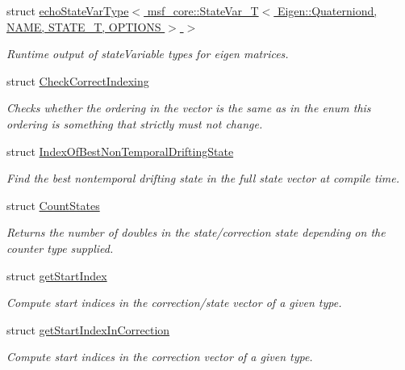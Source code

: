 \begin{DoxyCompactItemize}
struct \hyperlink{structmsf__tmp_1_1echoStateVarType_3_01msf__core_1_1StateVar__T_3_01Eigen_1_1Quaterniond_00_01NAd8d0cc57ae8a4161cb849186069681d6}{echo\-State\-Var\-Type$<$ msf\-\_\-core\-::\-State\-Var\-\_\-\-T$<$ Eigen\-::\-Quaterniond, N\-A\-M\-E, S\-T\-A\-T\-E\-\_\-\-T, O\-P\-T\-I\-O\-N\-S $>$ $>$}
\begin{DoxyCompactList}\small\item\em Runtime output of state\-Variable types for eigen matrices. \end{DoxyCompactList}\item 
struct \hyperlink{structmsf__tmp_1_1CheckCorrectIndexing}{Check\-Correct\-Indexing}
\begin{DoxyCompactList}\small\item\em Checks whether the ordering in the vector is the same as in the enum this ordering is something that strictly must not change. \end{DoxyCompactList}\item 
struct \hyperlink{structmsf__tmp_1_1IndexOfBestNonTemporalDriftingState}{Index\-Of\-Best\-Non\-Temporal\-Drifting\-State}
\begin{DoxyCompactList}\small\item\em Find the best nontemporal drifting state in the full state vector at compile time. \end{DoxyCompactList}\item 
struct \hyperlink{structmsf__tmp_1_1CountStates}{Count\-States}
\begin{DoxyCompactList}\small\item\em Returns the number of doubles in the state/correction state depending on the counter type supplied. \end{DoxyCompactList}\item 
struct \hyperlink{structmsf__tmp_1_1getStartIndex}{get\-Start\-Index}
\begin{DoxyCompactList}\small\item\em Compute start indices in the correction/state vector of a given type. \end{DoxyCompactList}\item 
struct \hyperlink{structmsf__tmp_1_1getStartIndexInCorrection}{get\-Start\-Index\-In\-Correction}
\begin{DoxyCompactList}\small\item\em Compute start indices in the correction vector of a given type. \end{DoxyCompactList}\item 

\end{DoxyCompactItemize}
